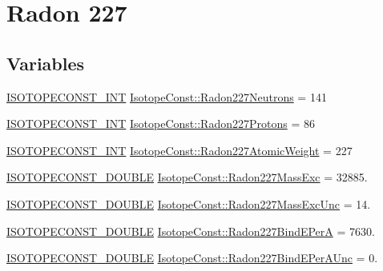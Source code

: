 \hypertarget{group___isotope_const-_radon-_rn227}{}\section{Radon 227}
\label{group___isotope_const-_radon-_rn227}
\subsection*{Variables}
\begin{DoxyCompactItemize}
\item 
\mbox{\hyperlink{group___isotope_const-_macros_ga5f18360b3e99483a35c32d789e62621c}{I\+S\+O\+T\+O\+P\+E\+C\+O\+N\+S\+T\+\_\+\+I\+NT}} \mbox{\hyperlink{group___isotope_const-_radon-_rn227_gabdfa075e1e4d79d49aad8cf054e34c84}{Isotope\+Const\+::\+Radon227\+Neutrons}} = 141
\item 
\mbox{\hyperlink{group___isotope_const-_macros_ga5f18360b3e99483a35c32d789e62621c}{I\+S\+O\+T\+O\+P\+E\+C\+O\+N\+S\+T\+\_\+\+I\+NT}} \mbox{\hyperlink{group___isotope_const-_radon-_rn227_ga8f5324f691cb4b610fbbe3853fc83da7}{Isotope\+Const\+::\+Radon227\+Protons}} = 86
\item 
\mbox{\hyperlink{group___isotope_const-_macros_ga5f18360b3e99483a35c32d789e62621c}{I\+S\+O\+T\+O\+P\+E\+C\+O\+N\+S\+T\+\_\+\+I\+NT}} \mbox{\hyperlink{group___isotope_const-_radon-_rn227_ga88937c71d6257636029433c377a47122}{Isotope\+Const\+::\+Radon227\+Atomic\+Weight}} = 227
\item 
\mbox{\hyperlink{group___isotope_const-_macros_ga8f45a7272ce02c0b4c65c44636ed719a}{I\+S\+O\+T\+O\+P\+E\+C\+O\+N\+S\+T\+\_\+\+D\+O\+U\+B\+LE}} \mbox{\hyperlink{group___isotope_const-_radon-_rn227_ga3136399b67412ee2270f86036de260c5}{Isotope\+Const\+::\+Radon227\+Mass\+Exc}} = 32885.
\item 
\mbox{\hyperlink{group___isotope_const-_macros_ga8f45a7272ce02c0b4c65c44636ed719a}{I\+S\+O\+T\+O\+P\+E\+C\+O\+N\+S\+T\+\_\+\+D\+O\+U\+B\+LE}} \mbox{\hyperlink{group___isotope_const-_radon-_rn227_ga3161f2cc3cb753380915d352208e8098}{Isotope\+Const\+::\+Radon227\+Mass\+Exc\+Unc}} = 14.
\item 
\mbox{\hyperlink{group___isotope_const-_macros_ga8f45a7272ce02c0b4c65c44636ed719a}{I\+S\+O\+T\+O\+P\+E\+C\+O\+N\+S\+T\+\_\+\+D\+O\+U\+B\+LE}} \mbox{\hyperlink{group___isotope_const-_radon-_rn227_ga65f52790edf533760de939dee17b0624}{Isotope\+Const\+::\+Radon227\+Bind\+E\+PerA}} = 7630.
\item 
\mbox{\hyperlink{group___isotope_const-_macros_ga8f45a7272ce02c0b4c65c44636ed719a}{I\+S\+O\+T\+O\+P\+E\+C\+O\+N\+S\+T\+\_\+\+D\+O\+U\+B\+LE}} \mbox{\hyperlink{group___isotope_const-_radon-_rn227_ga0af4528b0cf72f4831c5988d8b950f9c}{Isotope\+Const\+::\+Radon227\+Bind\+E\+Per\+A\+Unc}} = 0.

\end{DoxyCompactItemize}
